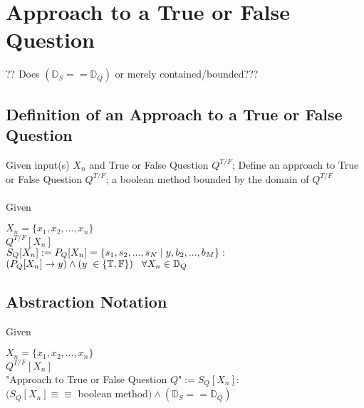 \documentclass[11pt]{article}
\begin{document}
\newpage

\section{Approach to a True or False Question}
?? Does $(\mathbb{D}_S == \mathbb{D}_Q)$ or merely contained/bounded???
\subsection{Definition of an Approach to a True or False Question}
Given input(s) $X_n$ and True or False Question $Q^{T/F}$; Define an approach to True or False Question $Q^{T/F}$;
a boolean method bounded by the domain of $Q^{T/F}$\\
\\
Given
\begin{center}
$
X_n = \{x_1,x_2,...,x_n\}
$
\\ \vspace{2mm}
$
Q^{T/F}[X_n]
$
\\ \vspace{6mm}
$
S_{Q}[X_n] := P_{Q}[X_n] =\{ s_1,s_2,...,s_{N}\hspace{1mm}|\hspace{1mm} y, b_2,...,b_M\} :
$
\\ \vspace{2mm}
$
(P_{Q}[X_n] \rightarrow y) \land(y \hspace{1mm} \in  \{\mathbb{T},\mathbb{F}\}) \hspace{3mm} \forall X_n \in \mathbb{D}_Q
$
\end{center}


\subsection{Abstraction Notation}
Given
\begin{center}
$
X_n = \{x_1,x_2,...,x_n\}
$
\\ \vspace{2mm}
$
Q^{T/F}[X_n]
$
\\ \vspace{6mm}
"Approach to True or False Question $Q$"$ := S_{Q}[X_n] :
$
\\ \vspace{2mm}
$
(S_{Q}[X_n] \equiv \equiv$ boolean method$)\land(\mathbb{D}_S == \mathbb{D}_Q)
$
\end{center}
\end{document}
